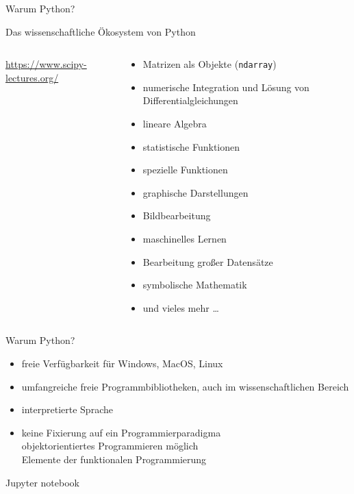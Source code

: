 \documentclass[t, utf8, 10pt]{beamer}
\begin{document}
\begin{frame}{Warum Python?}
\end{frame}

\begin{frame}{Das wissenschaftliche Ökosystem von Python}
 \begin{columns}
  \begin{column}{0.44\textwidth}

   \begin{footnotesize}
    \url{https://www.scipy-lectures.org/}
   \end{footnotesize}
  \end{column}%
  \begin{column}{0.56\textwidth}
   \begin{small}
    \begin{itemize}
     \setlength{\itemindent}{-10pt}
     \item Matrizen als Objekte (\texttt{ndarray})
     \item numerische Integration und Lösung von Differentialgleichungen
     \item lineare Algebra
     \item statistische Funktionen
     \item spezielle Funktionen
     \item graphische Darstellungen
     \item Bildbearbeitung
     \item maschinelles Lernen
     \item Bearbeitung großer Datensätze
     \item symbolische Mathematik
     \item und vieles mehr \ldots
    \end{itemize}
   \end{small}
  \end{column}
 \end{columns}
\end{frame}

\begin{frame}{Warum Python?}
 \begin{itemize}
  \item freie Verfügbarkeit für Windows, MacOS, Linux
  \item umfangreiche freie Programmbibliotheken, auch
        im wissenschaftlichen Bereich
  \item interpretierte Sprache
  \item keine Fixierung auf ein Programmierparadigma\\
        objektorientiertes Programmieren möglich\\
        Elemente der funktionalen Programmierung
 \end{itemize}
\end{frame}

\begin{frame}{Jupyter notebook}
\end{frame}
\end{document}
